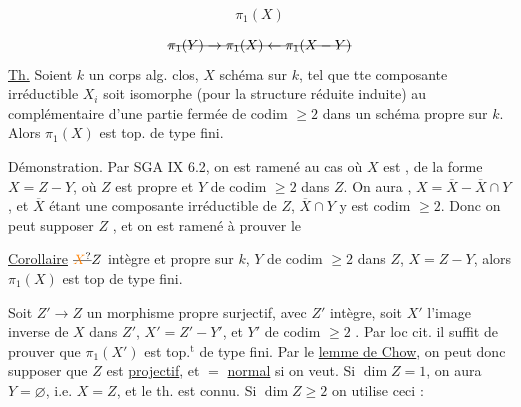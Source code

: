 \[
\pi_1(X)
\]


\[
\deleted{\pi_1(Y)\to\pi_1(X)\leftarrow\pi_1(X-Y)}
\]
\uline{Th.} Soient $k$ un corps alg. clos, $X$ schéma 
sur $k$,  tel que tte
composante irréductible $X_i$ soit isomorphe (pour
la structure réduite induite) au 
complémentaire d'une partie fermée de
codim $\geq 2$ dans un schéma propre sur $k$.
Alors $\pi_1(X)$ est top. de type fini.

Démonstration. Par SGA IX 6.2, on est
ramené au cas où $X$ est ,  de
la forme $X=Z-Y$, où $Z$ est propre et $Y$ de
codim $\geq 2$ dans $Z$. On aura ,
$X=\overline X-\overline X\cap Y$, et $\overline X$ étant une composante irréductible de $Z$, $\overline X\cap Y$ y est  codim $\geq 2$. Donc
on peut supposer $Z$ , et on est
ramené à prouver le

\uline{Corollaire} $\deleted{\unsure{X}}Z$ intègre et propre sur $k$, $Y$  de
codim $\geq 2$ dans $Z$, $X=Z-Y$, alors $\pi_1(X)$ est
top de type fini.

Soit $Z'\to Z$ un morphisme propre
surjectif, avec $Z'$ intègre, soit $X'$ l'image
inverse de $X$ dans $Z'$,  $X'=Z'-Y'$, et
$Y'$ de codim $\geq 2$ . Par loc cit. il
suffit de prouver que $\pi_1(X')$ est top.$^{\mathrm t}$
de type fini. Par le \uline{lemme de Chow},
on peut donc supposer que
$Z$ est \uline{projectif},  et $=$ \uline{normal}
si on veut. Si  $\dim Z=1$, on aura $Y=\varnothing$,
i.e. $X=Z$, et le th. est connu. Si $\dim Z\geq 2$
on utilise ceci :

